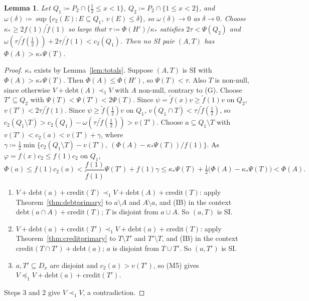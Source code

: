 \documentclass[11pt]{article}
\newtheorem{lemma}[theorem]{Lemma}
\theoremstyle{definition}\newtheorem{definition}[theorem]{Definition}
\theoremstyle{remark}\newtheorem{remark}[theorem]{Remark}
\newcommand{\debt}{\mathrm{debt}}
\newcommand{\cred}{\mathrm{credit}}
\newcommand{\ftil}{\tilde f}
\begin{document}
\begin{lemma}\label{lem:cap}
Let $Q_1\coloneqq P_2\cap\{\frac12\le x<1\}$, $Q_2\coloneqq P_2\cap\{1\le
x<2\}$, and $\omega(\delta)\coloneqq\sup\{c_2(E):E\subseteq Q_1,\ v(E)\le
\delta\}$, so $\omega(\delta)\to0$ as $\delta\to0$. Choose
$\kappa_*\ge2f(1)/\ftil(1)$ so large that $\tau\coloneqq\Phi(H')/\kappa_*$
satisfies $2\tau<\Psi(Q_2)$ and $\omega(\tau/\ftil(\frac12))+2\tau/\ftil(1)<
c_2(Q_1)$. Then no SI pair $(A,T)$ has $\Phi(A)>\kappa_*\Psi(T)$.
\end{lemma}
\begin{proof}
$\kappa_*$ exists by Lemma~\ref{lem:totals}. Suppose $(A,T)$ is SI with
$\Phi(A)>\kappa_*\Psi(T)$. Then $\Phi(A)\le\Phi(H')$, so $\Psi(T)<\tau$.
Also $T$ is non-null, since otherwise $V+\debt(A)\prec_1V$ with $A$
non-null, contrary to (G). Choose $T'\subseteq Q_2$ with
$\Psi(T)<\Psi(T')<2\Psi(T)$. Since $\psi=\ftil(x)v\ge\ftil(1)v$ on $Q_2$,
$v(T')<2\tau/\ftil(1)$. Since $\psi\ge\ftil(\frac12)v$ on $Q_1$,
$v(Q_1\cap T)<\tau/\ftil(\frac12)$, so $c_2(Q_1\setminus T)>c_2(Q_1)-
\omega(\tau/\ftil(\frac12))>v(T')$. Choose $a\subseteq Q_1\setminus T$ with
$v(T')<c_2(a)<v(T')+\gamma$, where
$\gamma\coloneqq\frac12\min\{c_2(Q_1\setminus T)-v(T'),\
(\Phi(A)-\kappa_*\Psi(T))/f(1)\}$. As $\varphi=f(x)c_2\le f(1)c_2$ on $Q_1$,
\[
 \Phi(a)\le f(1)c_2(a)<\frac{f(1)}{\ftil(1)}\Psi(T')+f(1)\gamma
 \le\kappa_*\Psi(T)+\tfrac12\bigl(\Phi(A)-\kappa_*\Psi(T)\bigr)<\Phi(A).
\]
\begin{enumerate}[label=\arabic*.,leftmargin=*,itemsep=1pt]
\item $V+\debt(a)+\cred(T)\prec_1V+\debt(A)+\cred(T)$: apply
Theorem~\ref{thm:debtprimary} to $a\setminus A$ and $A\setminus a$, and (IB)
in the context $\debt(a\cap A)+\cred(T)$; $T$ is disjoint from $a\cup A$. So
$(a,T)$ is SI.
\item $V+\debt(a)+\cred(T')\prec_1V+\debt(a)+\cred(T)$: apply
Theorem~\ref{thm:creditprimary} to $T\setminus T'$ and $T'\setminus T$, and
(IB) in the context $\cred(T\cap T')+\debt(a)$; $a$ is disjoint from
$T\cup T'$. So $(a,T')$ is SI.
\item $a,T'\subseteq D_x$ are disjoint and $c_2(a)>v(T')$, so (M5) gives
$V\preceq_1V+\debt(a)+\cred(T')$.
\end{enumerate}
Steps 3 and 2 give $V\prec_1V$, a contradiction.
\end{proof}
\end{document}
